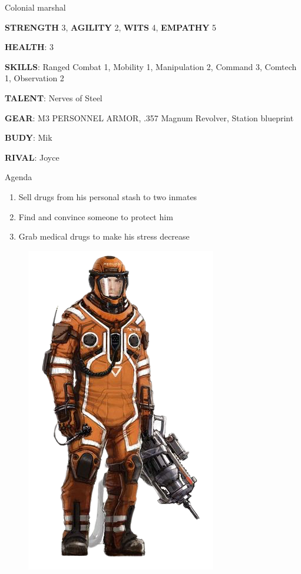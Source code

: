 \begin{rpg-commentbox}{}
    Colonial marshal

    \textbf{STRENGTH} 3, \textbf{AGILITY} 2, \textbf{WITS} 4, \textbf{EMPATHY} 5

    \textbf{HEALTH}: 3

    \textbf{SKILLS}: Ranged Combat 1, Mobility 1, Manipulation 2, Command 3, Comtech 1, Observation 2
    
    \textbf{TALENT}: Nerves of Steel
    
    \textbf{GEAR}: M3 PERSONNEL ARMOR, .357 Magnum Revolver, Station blueprint
      
    \textbf{BUDY}: Mik
    
    \textbf{RIVAL}: Joyce
\end{rpg-commentbox}


\begin{rpg-commentbox}{Agenda}
    \begin{enumerate}[label=\textbf{Act \arabic*}, leftmargin=1cm]
        \item Sell drugs from his personal stash to two inmates
        \item Find and convince someone to protect him
        \item Grab medical drugs to make his stress decrease
    \end{enumerate}
\end{rpg-commentbox}


\begin{figure}
    \centering
    \includegraphics[width=.55\textwidth]{img/bg/firefighter-2.png}
    \label{fig:refinery}
\end{figure}


